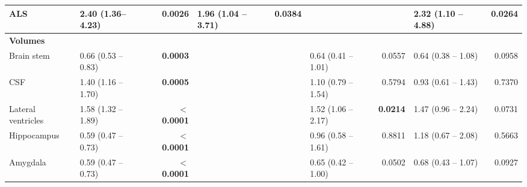 \begin{sidewaystable}
{\begin{tabular}{|l|lr|lr|lr|lr|}
\hspace{5mm}ALS & 2.40 (1.36--4.23) & \textbf{0.0026} & \textcolor[rgb]{0.2,0.2,0.2}{1.96 (1.04 -- 3.71)} & \textcolor[rgb]{0.2,0.2,0.2}{\textbf{0.0384}} & {\cellcolor[rgb]{0.753,0.753,0.753}} & {\cellcolor[rgb]{0.753,0.753,0.753}} & \textcolor[rgb]{0.2,0.2,0.2}{2.32 (1.10 -- 4.88)} & \textcolor[rgb]{0.2,0.2,0.2}{\textbf{0.0264}} \\ 
\hline
\multicolumn{1}{|l}{\textbf{Volumes}} &  & \multicolumn{1}{l}{} &  & \multicolumn{1}{l}{} &  & \multicolumn{1}{l}{} &  &  \\ 
\hline
Brain stem & \textcolor[rgb]{0.2,0.2,0.2}{0.66 (0.53 -- 0.83)} & \textcolor[rgb]{0.2,0.2,0.2}{\textbf{0.0003}} & {\cellcolor[rgb]{0.753,0.753,0.753}} & {\cellcolor[rgb]{0.753,0.753,0.753}} & \textcolor[rgb]{0.2,0.2,0.2}{0.64 (0.41 -- 1.01)} & \textcolor[rgb]{0.2,0.2,0.2}{0.0557} & \textcolor[rgb]{0.2,0.2,0.2}{0.64 (0.38 -- 1.08)} & \textcolor[rgb]{0.2,0.2,0.2}{0.0958} \\ 
\hline
CSF & \textcolor[rgb]{0.2,0.2,0.2}{1.40 (1.16 -- 1.70)} & \textcolor[rgb]{0.2,0.2,0.2}{\textbf{0.0005}} & {\cellcolor[rgb]{0.753,0.753,0.753}} & {\cellcolor[rgb]{0.753,0.753,0.753}} & \textcolor[rgb]{0.2,0.2,0.2}{1.10 (0.79 -- 1.54)} & \textcolor[rgb]{0.2,0.2,0.2}{0.5794} & \textcolor[rgb]{0.2,0.2,0.2}{0.93 (0.61 -- 1.43)} & \textcolor[rgb]{0.2,0.2,0.2}{0.7370} \\ 
\hline
Lateral ventricles & \textcolor[rgb]{0.2,0.2,0.2}{1.58 (1.32 -- 1.89)} & \textbf{$<$0.0001} & {\cellcolor[rgb]{0.753,0.753,0.753}} & {\cellcolor[rgb]{0.753,0.753,0.753}} & \textcolor[rgb]{0.2,0.2,0.2}{1.52 (1.06 -- 2.17)} & \textcolor[rgb]{0.2,0.2,0.2}{\textbf{0.0214}} & \textcolor[rgb]{0.2,0.2,0.2}{1.47 (0.96 -- 2.24)} & \textcolor[rgb]{0.2,0.2,0.2}{0.0731} \\ 
\hline
Hippocampus & \textcolor[rgb]{0.2,0.2,0.2}{0.59 (0.47 -- 0.73)} & \textbf{$<$0.0001} & {\cellcolor[rgb]{0.753,0.753,0.753}} & {\cellcolor[rgb]{0.753,0.753,0.753}} & \textcolor[rgb]{0.2,0.2,0.2}{0.96 (0.58 -- 1.61)} & \textcolor[rgb]{0.2,0.2,0.2}{0.8811} & \textcolor[rgb]{0.2,0.2,0.2}{1.18 (0.67 -- 2.08)} & \textcolor[rgb]{0.2,0.2,0.2}{0.5663} \\ 
\hline
Amygdala & \textcolor[rgb]{0.2,0.2,0.2}{0.59 (0.47 -- 0.73)} & \textbf{$<$0.0001} & {\cellcolor[rgb]{0.753,0.753,0.753}} & {\cellcolor[rgb]{0.753,0.753,0.753}} & \textcolor[rgb]{0.2,0.2,0.2}{0.65 (0.42 -- 1.00)} & \textcolor[rgb]{0.2,0.2,0.2}{0.0502} & \textcolor[rgb]{0.2,0.2,0.2}{0.68 (0.43 -- 1.07)} & \textcolor[rgb]{0.2,0.2,0.2}{0.0927} \\ 

\end{tabular}}
\end{sidewaystable}
